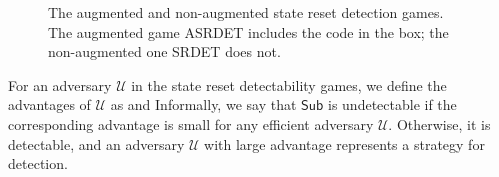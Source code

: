 \begin{figure}
\centering
\begin{pchstack}
\begin{pcvstack}
\pcvspace
{}
\end{pcvstack}
\pchspace
{}
\end{pchstack}
\caption[The augmented and non-augmented state reset detection games]{The augmented and non-augmented state reset detection games. The augmented game ASRDET includes the code in the box; the non-augmented one SRDET does not.}
\label{game:gendetect}
\end{figure}

For an adversary $\mathcal{U}$ in the state reset detectability games, we define the advantages of $\mathcal{U}$ as
and
Informally, we say that $\mathsf{Sub}$ is undetectable if the corresponding advantage is small for any efficient adversary $\mathcal{U}$. Otherwise, it is detectable, and an adversary $\mathcal{U}$ with large advantage represents a strategy for detection.

